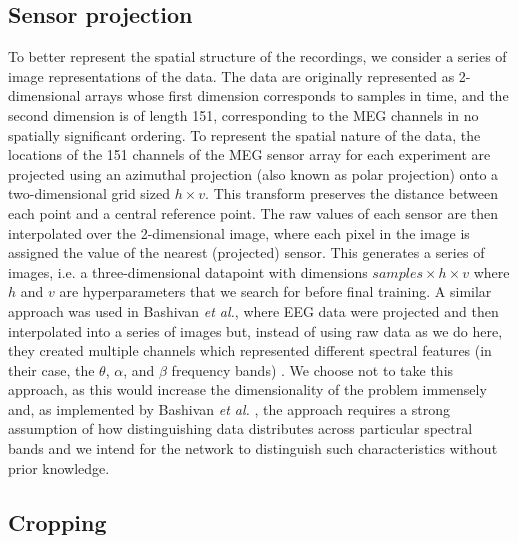 \documentclass[fleqn,10pt]{wlscirep}
\begin{document}
\subsection*{Sensor projection}\label{sec:sens_proj}

To better represent the spatial structure of the recordings, we consider a series of image representations of the data. The data are originally represented as 2-dimensional arrays whose first dimension corresponds to samples in time, and the second dimension is of length 151, corresponding to the MEG channels in no spatially significant ordering. To represent the spatial nature of the data, the locations of the 151 channels of the MEG sensor array for each experiment are projected using an azimuthal projection (also known as polar projection) onto a two-dimensional grid sized $h \times v$. This transform preserves the distance between each point and a central reference point. The raw values of each sensor are then interpolated over the 2-dimensional image, where each pixel in the image is assigned the value of the nearest (projected) sensor. This generates a series of images, i.e. a three-dimensional datapoint with dimensions $samples \times  h \times v$ where $h$ and $v$ are hyperparameters that we search for before final training. A similar approach was used in Bashivan {\em et al.}, where EEG data were projected and then interpolated into a series of images but, instead of using raw data as we do here, they created multiple channels which represented different spectral features (in their case, the $\theta$, $\alpha$, and $\beta$ frequency bands) \cite{Bashivan2016}. We choose not to take this approach, as this would increase the dimensionality of the problem immensely and, as implemented by Bashivan {\em et al.} \cite{Bashivan2016}, the approach requires a strong assumption of how distinguishing data distributes across particular spectral bands and we intend for the network to distinguish such characteristics without prior knowledge.

\subsection*{Cropping}
\end{document}
